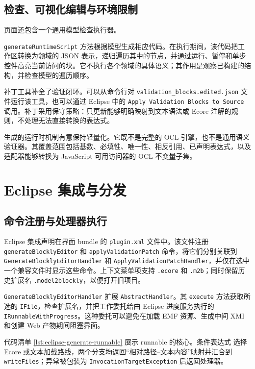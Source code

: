 \subsection{检查、可视化编辑与环境限制}

页面还包含一个通用模型检查执行器。

\texttt{generateRuntimeScript} 方法根据模型生成相应代码。在执行期间，该代码把工作区转换为领域的 JSON 表示，递归遍历其中的节点，并通过运行、暂停和单步控件高亮当前访问的块。它不执行各个领域的具体语义；其作用是观察已构建的结构，并检查模型的遍历顺序。

补丁工具补全了验证闭环。可以从命令行对 \texttt{validation\_blocks.edited.json} 文件运行该工具，也可以通过 Eclipse 中的 \texttt{Apply Validation Blocks to Source} 调用。补丁采用保守策略：只更新能够明确映射到文本语法或 Ecore 注解的规则，不处理无法直接转换的表达式。

生成的运行时机制有意保持轻量化。它既不是完整的 OCL 引擎，也不是通用语义验证器。其覆盖范围包括基数、必填性、唯一性、相反引用、已声明表达式，以及适配器能够转换为 JavaScript 可用访问器的 OCL 不变量子集。

\section{Eclipse 集成与分发}
\label{sec:implementacion-eclipse-distribucion}

\subsection{命令注册与处理器执行}

Eclipse 集成声明在界面 bundle 的 \texttt{plugin.xml} 文件中。该文件注册
\texttt{generateBlockly}\allowbreak\texttt{Editor} 和
\texttt{applyValidation}\allowbreak\texttt{Patch} 命令，将它们分别关联到
\texttt{GenerateBlockly}\allowbreak\texttt{EditorHandler} 和
\texttt{ApplyValidation}\allowbreak\texttt{PatchHandler}，并仅在选中一个兼容文件时显示这些命令。上下文菜单项支持 \texttt{.ecore} 和 \texttt{.m2b}；同时保留历史扩展名 \texttt{.model2blockly}，以便打开旧项目。

\texttt{GenerateBlockly}\allowbreak\texttt{EditorHandler} 扩展
\texttt{AbstractHandler}。其 \texttt{execute} 方法获取所选的 \texttt{IFile}，检查扩展名，并把工作委托给由 Eclipse 进度服务执行的
\texttt{IRunnableWith}\allowbreak\texttt{Progress}。这种委托可以避免在加载 EMF 资源、生成中间 XMI 和创建 Web 产物期间阻塞界面。

代码清单 \ref{lst:eclipse-generate-runnable} 展示 runnable 的核心。条件表达式
选择 Ecore 或文本加载路线，两个分支均返回“相对路径--文本内容”映射并汇合到
\texttt{writeFiles}；异常被包装为
\texttt{InvocationTarget}\allowbreak\texttt{Exception} 后返回处理器。

